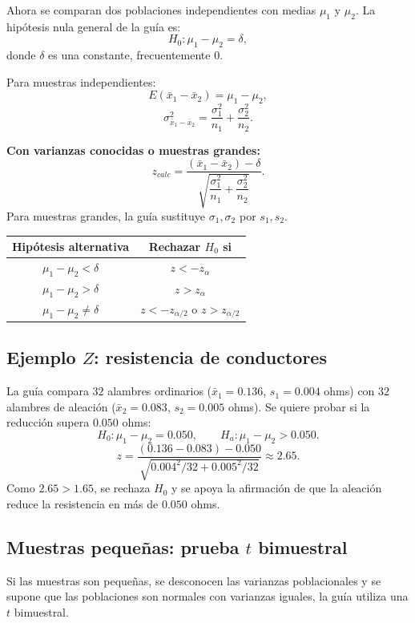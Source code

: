 \documentclass[11pt,a4paper]{article}
\begin{document}
Ahora se comparan dos poblaciones independientes con medias $\mu_1$ y $\mu_2$. La hipótesis nula general de la guía es:
\[
H_0:\mu_1-\mu_2=\delta,
\]
donde $\delta$ es una constante, frecuentemente $0$.

Para muestras independientes:
\[
E(\bar{x}_1-\bar{x}_2)=\mu_1-\mu_2,
\]
\[
\sigma^2_{\bar{x}_1-\bar{x}_2}=\frac{\sigma_1^2}{n_1}+\frac{\sigma_2^2}{n_2}.
\]

\textbf{Con varianzas conocidas o muestras grandes:}
\[
 z_{calc}=\frac{(\bar{x}_1-\bar{x}_2)-\delta}
 {\sqrt{\dfrac{\sigma_1^2}{n_1}+\dfrac{\sigma_2^2}{n_2}}}.
\]
Para muestras grandes, la guía sustituye $\sigma_1,\sigma_2$ por $s_1,s_2$.

\begin{table}[H]
\centering
\begin{tabular}{cc}
\toprule
Hipótesis alternativa & Rechazar $H_0$ si\\
\midrule
$\mu_1-\mu_2<\delta$ & $z<-z_\alpha$\\
$\mu_1-\mu_2>\delta$ & $z>z_\alpha$\\
$\mu_1-\mu_2\neq\delta$ & $z<-z_{\alpha/2}$ o $z>z_{\alpha/2}$\\
\bottomrule
\end{tabular}
\end{table}

\subsection{Ejemplo $Z$: resistencia de conductores}

La guía compara $32$ alambres ordinarios ($\bar{x}_1=0.136$, $s_1=0.004$ ohms) con $32$ alambres de aleación ($\bar{x}_2=0.083$, $s_2=0.005$ ohms). Se quiere probar si la reducción supera $0.050$ ohms:
\[
H_0:\mu_1-\mu_2=0.050,
\qquad
H_a:\mu_1-\mu_2>0.050.
\]
\[
z=\frac{(0.136-0.083)-0.050}
{\sqrt{0.004^2/32+0.005^2/32}}\approx2.65.
\]
Como $2.65>1.65$, se rechaza $H_0$ y se apoya la afirmación de que la aleación reduce la resistencia en más de $0.050$ ohms.

\subsection{Muestras pequeñas: prueba $t$ bimuestral}

Si las muestras son pequeñas, se desconocen las varianzas poblacionales y se supone que las poblaciones son normales con varianzas iguales, la guía utiliza una $t$ bimuestral.
\end{document}
